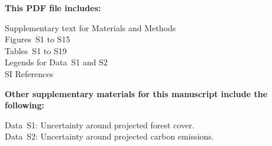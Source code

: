 \vspace{1cm}

\textbf{This PDF file includes:}

Supplementary text for Materials and Methods\\
Figures~S1 to S15\\
Tables~S1 to S19\\
Legends for Data~S1 and S2\\
SI References

\vspace{0.5cm}

\textbf{Other supplementary materials for this manuscript include the following:}

Data~S1: Uncertainty around projected forest cover.\\
Data~S2: Uncertainty around projected carbon emissions.

\newpage